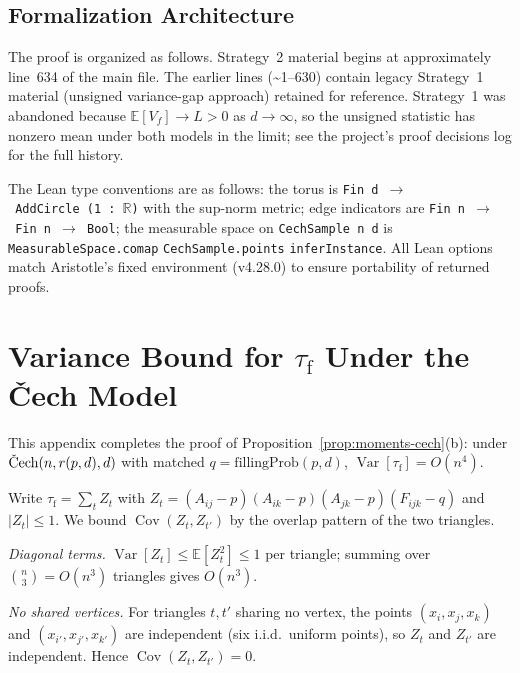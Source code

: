 \documentclass[reqno,12pt]{amsart}
\newcommand{\tauf}{\tau_{\mathrm{f}}}
\newcommand{\Cech}{\ifmmode\text{\v{C}ech}\else\v{C}ech\fi}  %
\newcommand{\fillingP}{\mathrm{fillingProb}}
\newcommand{\EE}{\mathbb{E}}
\DeclareMathOperator{\Var}{Var}
\DeclareMathOperator{\Cov}{Cov}
\theoremstyle{plain}
\theoremstyle{definition}
\theoremstyle{remark}
\begin{document}
\subsection*{Formalization Architecture}

The proof is organized as follows. Strategy~2 material begins at approximately line~634 of the
main file. The earlier lines (\textasciitilde1--630) contain legacy Strategy~1 material
(unsigned variance-gap approach) retained for reference. Strategy~1 was abandoned because
$\EE[V_f]\to L > 0$ as $d\to\infty$, so the unsigned statistic has nonzero mean under both
models in the limit; see the project's proof decisions log for the full history.

The Lean type conventions are as follows: the torus is
\texttt{Fin~d~$\to$~AddCircle~(1~:~$\mathbb{R}$)} with the sup-norm metric; edge
indicators are \texttt{Fin~n~$\to$~Fin~n~$\to$~Bool}; the measurable space on
\texttt{CechSample n d} is \texttt{MeasurableSpace.comap} \texttt{CechSample.points}
\texttt{inferInstance}. All Lean options match Aristotle's fixed environment (v4.28.0)
to ensure portability of returned proofs.

\section{Variance Bound for \texorpdfstring{$\tauf$}{tau\_f} Under the \v{C}ech Model}\label{app:variance-bound}

This appendix completes the proof of Proposition~\ref{prop:moments-cech}(b): under
$\Cech(n,r(p,d),d)$ with matched $q = \fillingP(p,d)$, $\Var[\tauf] = O(n^4)$.

Write $\tauf = \sum_t Z_t$ with $Z_t = (A_{ij}-p)(A_{ik}-p)(A_{jk}-p)(F_{ijk}-q)$ and
$|Z_t|\leq 1$. We bound $\Cov(Z_t,Z_{t'})$ by the overlap pattern of the two triangles.

\smallskip
\noindent\textit{Diagonal terms.} $\Var[Z_t]\leq\EE[Z_t^2] \leq 1$ per triangle;
summing over $\binom{n}{3} = O(n^3)$ triangles gives $O(n^3)$.

\smallskip
\noindent\textit{No shared vertices.} For triangles $t, t'$ sharing no
vertex, the points $(x_i,x_j,x_k)$ and $(x_{i'},x_{j'},x_{k'})$ are independent (six i.i.d.\
uniform points), so $Z_t$ and $Z_{t'}$ are independent. Hence $\Cov(Z_t,Z_{t'}) = 0$.
\end{document}
